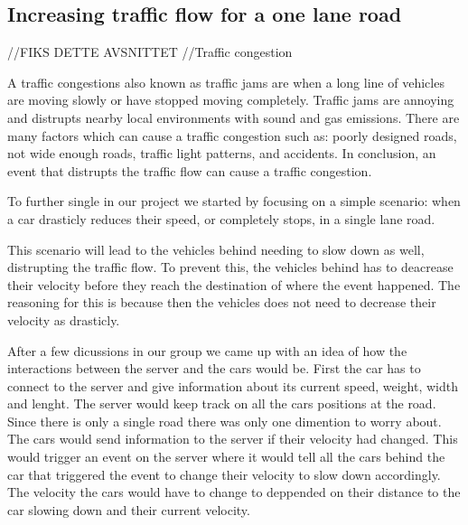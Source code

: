 \subsection{Increasing traffic flow for a one lane road}

//FIKS DETTE AVSNITTET
//Traffic congestion

A traffic congestions also known as traffic jams are when a long line of vehicles are moving slowly or have stopped moving completely. Traffic jams are annoying and distrupts nearby local environments with sound and gas emissions. There are many factors which can cause a traffic congestion such as:
poorly designed roads, not wide enough roads, traffic light patterns, and accidents. In conclusion, an event that distrupts the traffic flow can cause a traffic congestion.


To further single in our project we started by focusing on a simple scenario: when a car drasticly reduces their speed, or completely stops, in a single lane road. 

This scenario will lead to the vehicles behind needing to slow down as well, distrupting the traffic flow. To prevent this, the vehicles behind has to deacrease their velocity before they reach the destination of where the event happened. The reasoning for this is because then the vehicles does not need to decrease their velocity as drasticly. 

After a few dicussions in our group we came up with an idea of how the interactions between the server and the cars would be. First the car has to connect to the server and give information about its current speed, weight, width and lenght. The server would keep track on all the cars positions at the road. Since there is only a single road there was only one dimention to worry about. The cars would send information to the server if their velocity had changed. This would trigger an event on the server where it would tell all the cars behind the car that triggered the event to change their velocity to slow down accordingly. The velocity the cars would have to change to deppended on their distance to the car slowing down and their current velocity.       